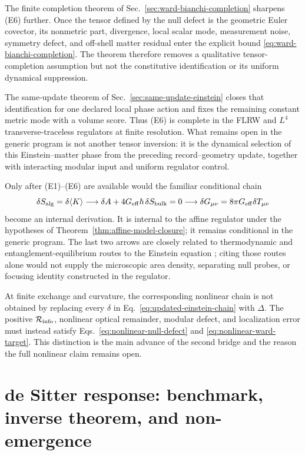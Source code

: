 The finite completion theorem of
Sec.~\ref{sec:ward-bianchi-completion} sharpens (E6) further.  Once the tensor
defined by the null defect is the geometric Euler covector, its nonmetric
part, divergence, local scalar mode, measurement noise, symmetry defect, and
off-shell matter residual enter the explicit bound
\eqref{eq:ward-bianchi-completion}.  The theorem therefore removes a
qualitative tensor-completion assumption but not the constitutive
identification or its uniform dynamical suppression.

The same-update theorem of Sec.~\ref{sec:same-update-einstein} closes that
identification for one declared local phase action and fixes the remaining
constant metric mode with a volume score.  Thus (E6) is complete in the FLRW
and \(L^4\) transverse-traceless regulators at finite resolution.  What
remains open in the generic program is not another tensor inversion: it is
the dynamical selection of this Einstein--matter phase from the preceding
record--geometry update, together with interacting modular input and uniform
regulator control.

Only after (E1)--(E6) are available would the familiar conditional chain
\begin{equation}
 \delta S_{\rm alg}
 =\delta\langle K\rangle
 \longrightarrow
 \delta A+4G_{\rm eff}\hbar\,\delta S_{\rm bulk}=0
 \longrightarrow
 \delta G_{\mu\nu}=8\pi G_{\rm eff}\delta T_{\mu\nu}
 \label{eq:updated-einstein-chain}
\end{equation}
become an internal derivation.  It is internal to the affine regulator under
the hypotheses of Theorem~\ref{thm:affine-model-closure}; it remains
conditional in the generic program.  The last two arrows are closely related
to thermodynamic and entanglement-equilibrium routes to the Einstein equation
\cite{Jacobson1995,Jacobson2015}; citing those routes alone would not supply
the microscopic area density, separating null probes, or focusing identity
constructed in the regulator.

At finite exchange and curvature, the corresponding nonlinear chain is not
obtained by replacing every \(\delta\) in
Eq.~\eqref{eq:updated-einstein-chain} with \(\Delta\).  The positive
\(\mathcal R_{\rm info}\), nonlinear optical remainder, modular defect, and
localization error must instead satisfy
Eqs.~\eqref{eq:nonlinear-null-defect} and
\eqref{eq:nonlinear-ward-target}.  This distinction is the main advance of
the second bridge and the reason the full nonlinear claim remains open.

\section{de Sitter response: benchmark, inverse theorem, and non-emergence}
\label{sec:updated-desitter}

